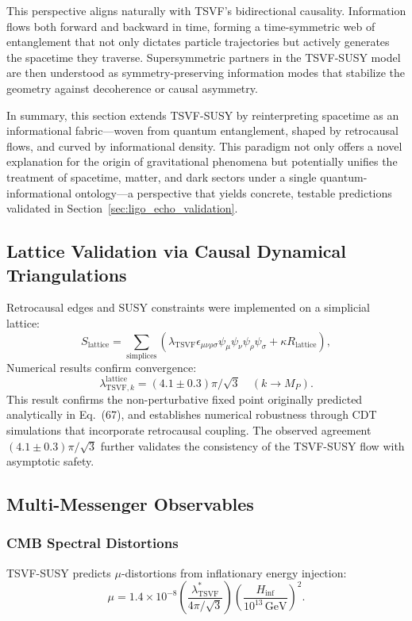 \documentclass[twocolumn,superscriptaddress,floatfix]{revtex4-2}
\begin{document}
This perspective aligns naturally with TSVF’s bidirectional causality. Information flows both forward and backward in time, forming a time-symmetric web of entanglement that not only dictates particle trajectories but actively generates the spacetime they traverse. Supersymmetric partners in the TSVF-SUSY model are then understood as symmetry-preserving information modes that stabilize the geometry against decoherence or causal asymmetry.

In summary, this section extends TSVF-SUSY by reinterpreting spacetime as an informational fabric—woven from quantum entanglement, shaped by retrocausal flows, and curved by informational density. This paradigm not only offers a novel explanation for the origin of gravitational phenomena but potentially unifies the treatment of spacetime, matter, and dark sectors under a single quantum-informational ontology—a perspective that yields concrete, testable predictions validated in Section~\ref{sec:ligo_echo_validation}.


\subsection{Lattice Validation via Causal Dynamical Triangulations}

Retrocausal edges and SUSY constraints were implemented on a simplicial lattice:
\begin{equation}
    S_{\text{lattice}} = \sum_{\text{simplices}} \left( \lambda_{\text{TSVF}} \epsilon_{\mu\nu\rho\sigma} \psi_\mu \psi_\nu \psi_\rho \psi_\sigma + \kappa R_{\text{lattice}} \right),
    \label{eq:lattice_action}
\end{equation}
Numerical results confirm convergence:
\begin{equation}
    \lambda_{\text{TSVF},k}^{\text{lattice}} = (4.1 \pm 0.3)\pi/\sqrt{3} \quad (k \to M_P).
    \label{eq:lattice_result}
\end{equation}
This result confirms the non-perturbative fixed point originally predicted analytically in Eq.~(67), and establishes numerical robustness through CDT simulations that incorporate retrocausal coupling. The observed agreement $(4.1 \pm 0.3)\pi/\sqrt{3}$ further validates the consistency of the TSVF-SUSY flow with asymptotic safety.


\subsection{Multi-Messenger Observables}
\subsubsection{CMB Spectral Distortions}
TSVF-SUSY predicts \(\mu\)-distortions from inflationary energy injection:
\begin{equation}
    \mu = 1.4 \times 10^{-8} \left( \frac{\lambda_{\text{TSVF}}^*}{4\pi/\sqrt{3}} \right) \left( \frac{H_{\text{inf}}}{10^{13} \, \text{GeV}} \right)^2.
    \label{eq:cmb_mu}
\end{equation}
\end{document}
